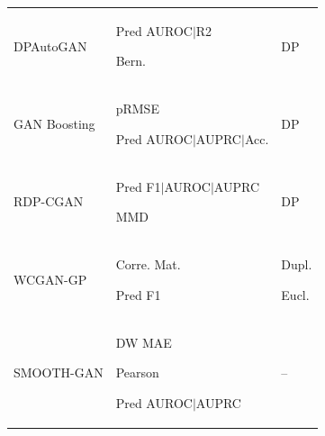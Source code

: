 \begin{landscape}
\begin{table}[htbp]
\begin{tabular}{p{26mm} p{84mm} p{60mm}}
DPAutoGAN & \begin{enumerate*} \item Pred AUROC$\vert$R2  \item Bern. \end{enumerate*}	
 &	DP \\
GAN Boosting & \begin{enumerate*} \item pRMSE \item Pred AUROC$\vert$AUPRC$\vert$Acc. \end{enumerate*}	
	& DP \\
RDP-CGAN & \begin{enumerate*} \item Pred F1$\vert$AUROC$\vert$AUPRC \item MMD  \end{enumerate*}	
	& DP \\
WCGAN-GP & \begin{enumerate*} \item Corre. Mat.
 \item Pred F1  \end{enumerate*} & \begin{enumerate*} \item Dupl.
\item Eucl. \end{enumerate*} \\
SMOOTH-GAN & \begin{enumerate*} \item DW MAE \item Pearson  \item Pred AUROC$\vert$AUPRC \end{enumerate*}	
	& -- \\
\hline

\end{tabular}
\end{table}
\end{landscape}


